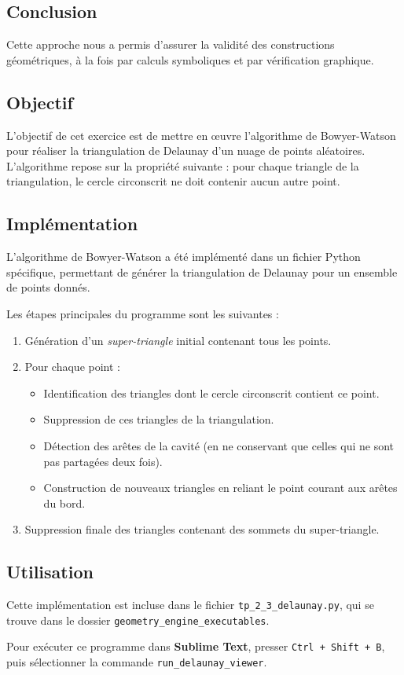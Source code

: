 \documentclass[a4paper,12pt]{article}
\begin{document}
\subsection*{Conclusion}

Cette approche nous a permis d’assurer la validité des constructions géométriques, à la fois par calculs symboliques et par vérification graphique.



\subsection*{Objectif}

L'objectif de cet exercice est de mettre en œuvre l'algorithme de Bowyer-Watson pour réaliser la triangulation de Delaunay d’un nuage de points aléatoires. L'algorithme repose sur la propriété suivante : pour chaque triangle de la triangulation, le cercle circonscrit ne doit contenir aucun autre point.

\subsection*{Implémentation}

L'algorithme de Bowyer-Watson a été implémenté dans un fichier Python spécifique, permettant de générer la triangulation de Delaunay pour un ensemble de points donnés. 

Les étapes principales du programme sont les suivantes :

\begin{enumerate}
    \item Génération d’un \textit{super-triangle} initial contenant tous les points.
    \item Pour chaque point :
    \begin{itemize}
        \item Identification des triangles dont le cercle circonscrit contient ce point.
        \item Suppression de ces triangles de la triangulation.
        \item Détection des arêtes de la cavité (en ne conservant que celles qui ne sont pas partagées deux fois).
        \item Construction de nouveaux triangles en reliant le point courant aux arêtes du bord.
    \end{itemize}
    \item Suppression finale des triangles contenant des sommets du super-triangle.
\end{enumerate}

\subsection*{Utilisation}

Cette implémentation est incluse dans le fichier \texttt{tp\_2\_3\_delaunay.py}, qui se trouve dans le dossier \texttt{geometry\_engine\_executables}.

Pour exécuter ce programme dans \textbf{Sublime Text}, presser \texttt{Ctrl + Shift + B}, puis sélectionner la commande \texttt{run\_delaunay\_viewer}.
\end{document}

